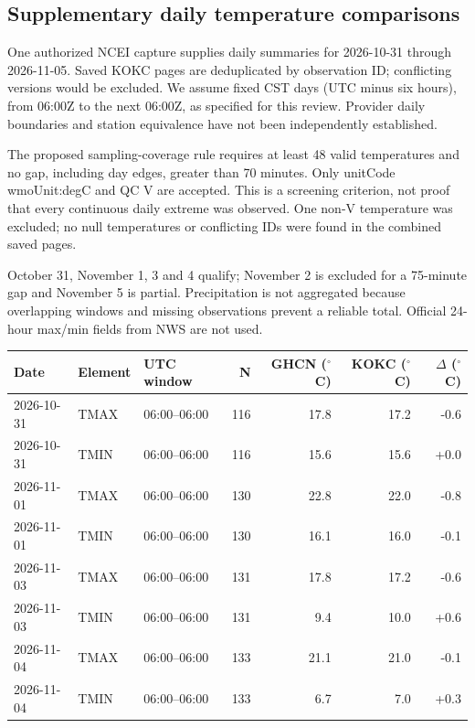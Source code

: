 \subsection{Supplementary daily temperature comparisons}

One authorized NCEI capture supplies daily summaries for 2026-10-31 through 2026-11-05. Saved KOKC pages are deduplicated by observation ID; conflicting versions would be excluded. We assume fixed CST days (UTC minus six hours), from 06:00Z to the next 06:00Z, as specified for this review. Provider daily boundaries and station equivalence have not been independently established.

The proposed sampling-coverage rule requires at least 48 valid temperatures and no gap, including day edges, greater than 70 minutes. Only unitCode wmoUnit:degC and QC V are accepted. This is a screening criterion, not proof that every continuous daily extreme was observed. One non-V temperature was excluded; no null temperatures or conflicting IDs were found in the combined saved pages.

October 31, November 1, 3 and 4 qualify; November 2 is excluded for a 75-minute gap and November 5 is partial. Precipitation is not aggregated because overlapping windows and missing observations prevent a reliable total. Official 24-hour max/min fields from NWS are not used.

\begin{longtable}{llL{2cm}rrrr}

\toprule Date & Element & UTC window & N & GHCN ($^{\circ}$C) & KOKC ($^{\circ}$C) & $\Delta$ ($^{\circ}$C) \\

\midrule\endhead

2026-10-31 & TMAX & 06:00--06:00 & 116 & 17.8 & 17.2 & -0.6 \\

2026-10-31 & TMIN & 06:00--06:00 & 116 & 15.6 & 15.6 & +0.0 \\

2026-11-01 & TMAX & 06:00--06:00 & 130 & 22.8 & 22.0 & -0.8 \\

2026-11-01 & TMIN & 06:00--06:00 & 130 & 16.1 & 16.0 & -0.1 \\

2026-11-03 & TMAX & 06:00--06:00 & 131 & 17.8 & 17.2 & -0.6 \\

2026-11-03 & TMIN & 06:00--06:00 & 131 & 9.4 & 10.0 & +0.6 \\

2026-11-04 & TMAX & 06:00--06:00 & 133 & 21.1 & 21.0 & -0.1 \\

2026-11-04 & TMIN & 06:00--06:00 & 133 & 6.7 & 7.0 & +0.3 \\

\bottomrule\end{longtable}

